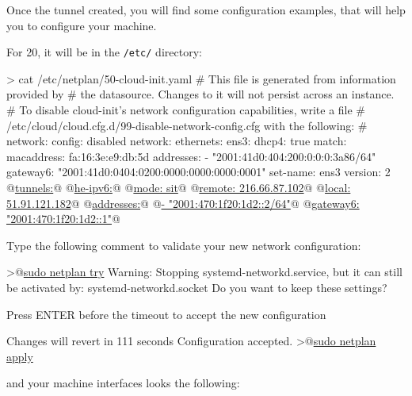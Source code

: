 Once the tunnel created, you will find some configuration examples, that will help you to configure your machine.

For  20, it will be in the \texttt{/etc/} directory:

\begin{termc}[backgroundcolor=\color{palerod}, basicstyle=\ttfamily\tiny, escapechar=@]
> cat /etc/netplan/50-cloud-init.yaml
# This file is generated from information provided by
# the datasource.  Changes to it will not persist across an instance.
# To disable cloud-init's network configuration capabilities, write a file
# /etc/cloud/cloud.cfg.d/99-disable-network-config.cfg with the following:
# network: {config: disabled}
network:
    ethernets:
        ens3:
            dhcp4: true
            match:
                macaddress: fa:16:3e:e9:db:5d
            addresses:
            - "2001:41d0:404:200:0:0:0:3a86/64"
            gateway6: "2001:41d0:0404:0200:0000:0000:0000:0001"
            set-name: ens3
    version: 2
    @\underline{tunnels:}@
      @\underline{he-ipv6:}@
       @\underline{mode: sit}@
       @\underline{remote: 216.66.87.102}@
       @\underline{local: 51.91.121.182}@
       @\underline{addresses:}@
         @\underline{- "2001:470:1f20:1d2::2/64"}@
       @\underline{gateway6: "2001:470:1f20:1d2::1"}@
\end{termc}

\noindent 
Type the following comment to validate your new network configuration:
\begin{termc}[backgroundcolor=\color{palerod}, basicstyle=\ttfamily\tiny, escapechar=@]
>@\underline{sudo netplan try}
Warning: Stopping systemd-networkd.service, but it can still be activated by:
  systemd-networkd.socket
Do you want to keep these settings?


Press ENTER before the timeout to accept the new configuration


Changes will revert in 111 seconds
Configuration accepted.
>@\underline{sudo netplan apply}
\end{termc}
and your machine interfaces looks the following:



